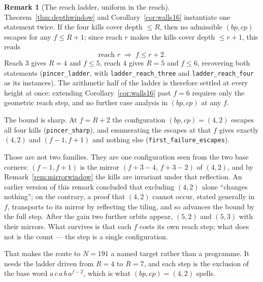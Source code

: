 \documentclass[11pt,reqno]{amsart}
\theoremstyle{plain}
\theoremstyle{definition}
\newtheorem{remark}[theorem]{Remark}
\begin{document}
\begin{remark}[The reach ladder, uniform in the reach]\label{rem:ladder}
Theorem~\ref{thm:depthwindow} and Corollary~\ref{cor:walls16} instantiate one statement twice.
If the four kills cover depth $\le R$, then no admissible $(bp,cp)$ escapes for any $f\le R+1$;
since reach $r$ makes the kills cover depth $\le r+1$, this reads
\[
  \text{reach } r \;\Longrightarrow\; f\le r+2 .
\]
Reach $3$ gives $R=4$ and $f\le5$, reach $4$ gives $R=5$ and $f\le6$, recovering both statements
(\texttt{pincer\_ladder}, with \texttt{ladder\_reach\_three} and \texttt{ladder\_reach\_four} as
its instances). The arithmetic half of the ladder is therefore settled at every height at once:
extending Corollary~\ref{cor:walls16} past $f=6$ requires only the geometric reach step, and no
further case analysis in $(bp,cp)$ at any $f$.

The bound is sharp. At $f=R+2$ the configuration $(bp,cp)=(4,2)$ escapes all four kills
(\texttt{pincer\_sharp}), and enumerating the escapes at that $f$ gives exactly $(4,2)$ and
$(f-1,f+1)$ and nothing else (\texttt{first\_failure\_escapes}).

Those are not two families. They are one configuration seen from the two base corners:
$(f-1,f+1)$ is the mirror $(f+3-4,\,f+3-2)$ of $(4,2)$, and by Remark~\ref{rem:mirrorwindow} the
kills are invariant under that reflection. An earlier version of this remark concluded that
excluding $(4,2)$ alone ``changes nothing''; on the contrary, a proof that $(4,2)$ cannot occur,
stated generally in $f$, transports to its mirror by reflecting the tiling, and so advances the
bound by the full step. After the gain two further orbits appear, $(5,2)$ and $(5,3)$ with their
mirrors. What survives is that each $f$ costs its own reach step; what does not is the count --- the
step is a single configuration.

That makes the route to $N=191$ a named target rather than a programme. It needs the ladder driven
from $R=4$ to $R=7$, and each step is the exclusion of the base word $a\,c\,a\,b\,a^{f-2}$,
which is what $(bp,cp)=(4,2)$ spells.
\end{remark}
\end{document}
